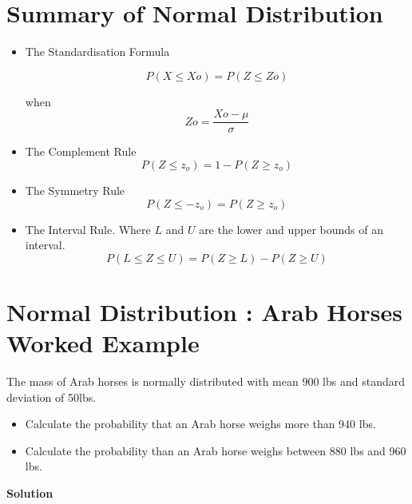 ﻿\documentclass[]{report}
\begin{document}
\section{Summary of Normal Distribution}



\begin{framed}
	\begin{itemize}
			\item The Standardisation Formula
			
			\[P(X \leq Xo) = P(Z \leq Zo)	  \]  
			
			when   \[Zo=\frac{Xo- \mu}{\sigma}\]
		\item The Complement Rule
		\begin{equation}
		P(Z \leq z_o) = 1 - P(Z \geq z_o)
		\end{equation}
		\item The Symmetry Rule
		\begin{equation}
		P(Z \leq -z_o) = P(Z \geq z_o)
		\end{equation}
		\item The Interval Rule.
		Where $L$ and $U$ are the lower and upper bounds of an interval.
		\begin{equation}
		P(L \leq Z \leq U) = P(Z \geq L) -  P(Z \geq U)
		\end{equation}
		
	\end{itemize}
\end{framed}
	
\section{Normal Distribution : Arab Horses Worked Example}
The mass of Arab horses is normally distributed with mean 900 lbs and standard deviation of 50lbs.
\begin{itemize}
	
	\item  Calculate the probability that an Arab horse weighs more than 940 lbs.
	\item Calculate the probability than an Arab horse weighs between 880 lbs and 960 lbs.
\end{itemize}

\noindent \textbf{Solution}\\
\end{document}

